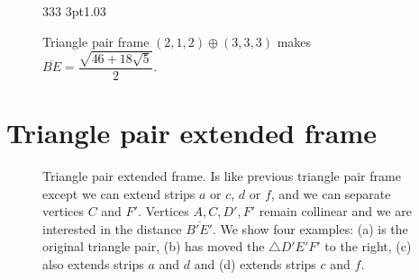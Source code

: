 \documentclass[11pt]{article}
\begin{document}
\begin{figure}[H]
\centering
\begin{center}
 {3}{3}{3} {3pt}{1.0}{3} %
\end{center}
\caption{Triangle pair frame $(2,1,2) \oplus (3,3,3)$ makes $\overline{BE} = \dfrac{\sqrt{46+18\sqrt{5}}}{2}$.}
\label{fig:tripair212333}
\end{figure}

\section{Triangle pair extended frame}

\begin{figure}[H]
 \centering
 \caption{Triangle pair extended frame. Is like previous triangle pair frame except
 we can extend strips $a$ or $c$, $d$ or $f$, and we can separate vertices $C$ and $F'$.
 Vertices $A,C,D',F'$ remain collinear and we are interested in the distance $\overline{B'E'}$.
 We show four examples: (a) is the original triangle pair,
 (b) has moved the $\triangle{D'E'F'}$ to the right,
 (c) also extends strips $a$ and $d$ and (d) extends strips $c$ and $f$.
 }
 \label{fig:tripairext}
\end{figure}
\end{document}
